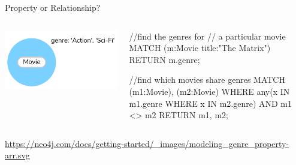 \documentclass[ignorenonframetext,xcolor=x11names]{beamer}
\begin{document}
\begin{frame}[fragile]{Property or Relationship?}
\begin{columns}
\begin{column}{.35\textwidth}
\includegraphics[width=\columnwidth]{screen5.png}
\end{column}
\begin{column}{.65\textwidth}
\scriptsize
\begin{cyphercode}
//find the genres for 
// a particular movie
MATCH (m:Movie {title:"The Matrix"})
RETURN m.genre;

//find which movies share genres
MATCH (m1:Movie), (m2:Movie)
WHERE any(x IN m1.genre 
          WHERE x IN m2.genre)
AND m1 <> m2
RETURN m1, m2;
\end{cyphercode}
\end{column}
\end{columns}
\tiny{\url{https://neo4j.com/docs/getting-started/\_images/modeling\_genre\_property-arr.svg}}
\end{frame}
\end{document}
